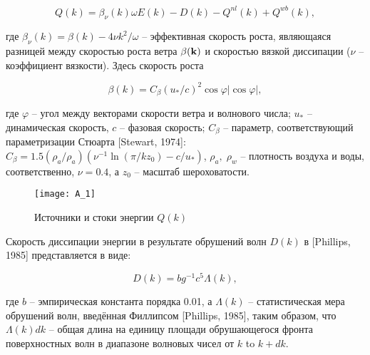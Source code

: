\begin{equation} \label{1.31)} Q(k)=\beta _{\nu } (k)\omega E(k)-D(k)-Q^{nl} (k)+Q^{wb} (k), \end{equation} 



\noindent где $\beta _{\nu } (k)=\beta (k)-4\nu k^{2} /\omega $ -- эффективная скорость роста, являющаяся разницей между скоростью роста ветра $\beta ({\bf k})$ и скоростью вязкой диссипации ($\nu $ -- коэффициент вязкости). Здесь скорость роста



\begin{equation} \label{1.32)} \beta (k)=C_{\beta } (u_{*} /c)^{2} \cos \varphi |\cos \varphi |, \end{equation} 



\noindent где $\varphi $ -- угол между векторами скорости ветра и волнового числа; $u_{*} $ -- динамическая скорость, $c$ -- фазовая скорость; $C_{\beta } $ -- параметр, соответствующий параметризации Стюарта [Stewart, 1974]: $C_{\beta } =1.5(\rho _{a} /\rho _{a} )(\nu ^{-1} \ln (\pi /kz_{0} )-c/u_{*} )$, $\rho _{a} ,\; \rho _{w} $ -- плотность воздуха и воды, соответственно, $\nu =0.4$, а $z_{0} $ -- масштаб шероховатости. 



\begin{figure}[H]
    \texttt{[image: A\_1]}
    \caption{Источники и стоки энергии $Q(k)$}
    \label{fig:A.1}
\end{figure}


Скорость диссипации энергии в результате обрушений волн $D(k)$ в  [Phillips, 1985] представляется в виде:



\begin{equation} \label{1.33)} D(k)=bg^{-1} c^{5} \Lambda (k), \end{equation} 



\noindent где $b$ -- эмпирическая константа порядка 0.01, а $\Lambda (k)$ -- статистическая мера обрушений волн, введённая Филлипсом [Phillips, 1985], таким образом, что $\Lambda (k)dk$ -- общая длина на единицу площади обрушающегося фронта поверхностных волн в диапазоне волновых чисел от $k$ to $k+dk$.

